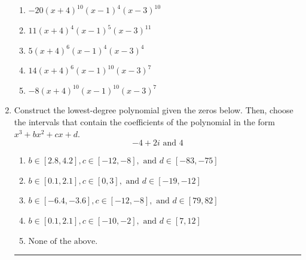 \documentclass[14pt]{extbook}
\newcommand{\litem}[1]{\item#1\hspace*{-1cm}\rule{\textwidth}{0.4pt}}
\begin{document}
\begin{enumerate}
{\begin{center}
\end{center}
\begin{enumerate}[label=\Alph*.]
\item \( -20(x + 4)^{10} (x - 1)^{4} (x - 3)^{10} \)
\item \( 11(x + 4)^{4} (x - 1)^{5} (x - 3)^{11} \)
\item \( 5(x + 4)^{6} (x - 1)^{4} (x - 3)^{4} \)
\item \( 14(x + 4)^{6} (x - 1)^{10} (x - 3)^{7} \)
\item \( -8(x + 4)^{10} (x - 1)^{10} (x - 3)^{7} \)

\end{enumerate} }
\litem{
Construct the lowest-degree polynomial given the zeros below. Then, choose the intervals that contain the coefficients of the polynomial in the form $x^3+bx^2+cx+d$.\[ -4 + 2 i \text{ and } 4 \]\begin{enumerate}[label=\Alph*.]
\item \( b \in [2.8, 4.2], c \in [-12, -8], \text{ and } d \in [-83, -75] \)
\item \( b \in [0.1, 2.1], c \in [0, 3], \text{ and } d \in [-19, -12] \)
\item \( b \in [-6.4, -3.6], c \in [-12, -8], \text{ and } d \in [79, 82] \)
\item \( b \in [0.1, 2.1], c \in [-10, -2], \text{ and } d \in [7, 12] \)
\item \( \text{None of the above.} \)

\end{enumerate} }
\end{enumerate}
\end{document}
